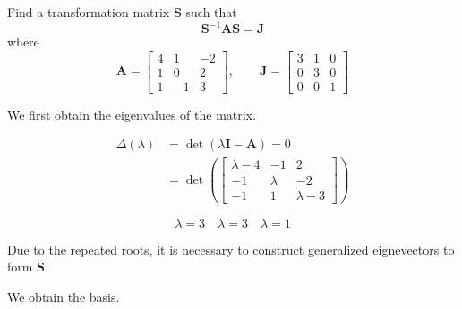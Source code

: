 \item Find a transformation matrix $\mathbf{S}$ such that
\begin{equation*}
 \mathbf{S}^{-1} \mathbf{A} \mathbf{S} = \mathbf{J}
\end{equation*}
where
\begin{equation*}
 \mathbf{A} = \begin{bmatrix}
      4 & 1 & -2\\
      1 & 0 & 2\\
      1 & -1 & 3
     \end{bmatrix}
, \qquad
\mathbf{J} = \begin{bmatrix}
     3 & 1 & 0\\
     0 & 3 & 0\\
     0 & 0 & 1
    \end{bmatrix}
\end{equation*}

We first obtain the eigenvalues of the matrix.

\begin{align*}
 \Delta (\lambda) &=
 \det (\lambda \mathbf{I} - \mathbf{A}) = 0\\
 &=  \det \left (
 \begin{bmatrix}
  \lambda -4 & -1 & 2\\
  -1 & \lambda & -2\\
  -1 & 1 & \lambda -3
 \end{bmatrix}
 \right)
\end{align*}

\begin{equation*}
 \lambda = 3 \quad \lambda = 3 \quad \lambda = 1
\end{equation*}

Due to the repeated roots, it is necessary to
construct generalized eignevectors to form $\mathbf{S}$.

We obtain the basis.

